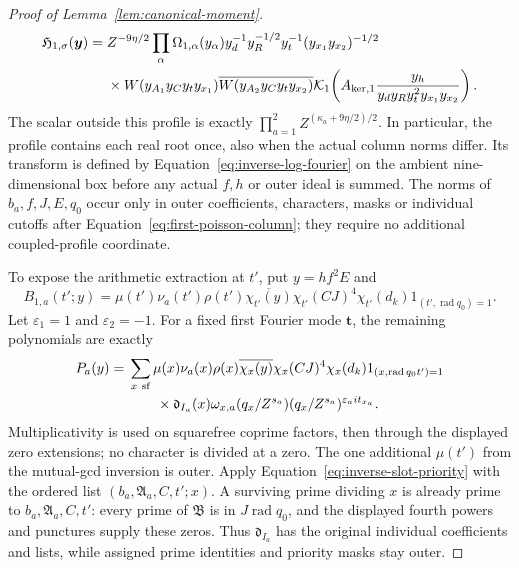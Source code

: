 \documentclass[11pt,a4paper]{article}
\numberwithin{equation}{section}
\numberwithin{figure}{section}
\theoremstyle{definition}
\theoremstyle{remark}
\begin{document}
\begin{proof}[Proof of Lemma~\ref{lem:canonical-moment}]
\begin{equation}
 \begin{split}
 \mathfrak H_{1,\sigma}(\boldsymbol y)={}&Z^{-9\eta/2}
 \prod_\alpha\Omega_{1,\alpha}(y_\alpha)
 y_d^{-1}y_R^{-1/2}y_t^{-1}(y_{x_1}y_{x_2})^{-1/2}\\
 &\times W(y_{A_1}y_Cy_ty_{x_1})
       \overline{W(y_{A_2}y_Cy_ty_{x_2})}
 \mathcal K_1\!\left(A_{{\rm ker},1}
       \frac{y_h}{y_dy_Ry_t^2y_{x_1}y_{x_2}}\right).
 \end{split}
\end{equation}
The scalar outside this profile is exactly
\(\prod_{a=1}^2Z^{(\kappa_a+9\eta/2)/2}\).
In particular, the profile contains each real root once, also when the
actual column norms differ.  Its transform is defined by
Equation~\eqref{eq:inverse-log-fourier} on the ambient nine-dimensional
box before any actual \(f,h\) or outer ideal is summed.  The norms of
\(b_a,f,J,E,q_0\) occur only in outer coefficients, characters, masks
or individual cutoffs after Equation~\eqref{eq:first-poisson-column};
they require no additional coupled-profile coordinate.

To expose the arithmetic extraction at \(t'\), put \(y=hf^2E\) and
\[
 B_{1,a}(t';y)=\mu(t')\nu_a(t')\rho(t')\overline{\chi_{t'}(y)}
       \chi_{t'}(CJ)^4\chi_{t'}(d_k)1_{(t',\operatorname{rad}q_0)=1}.
\]
Let \(\varepsilon_1=1\) and \(\varepsilon_2=-1\).  For a fixed first
Fourier mode \(\boldsymbol t\), the remaining polynomials are exactly
\begin{equation}\label{eq:inverse-first-polynomial}
 \begin{split}
 P_a(y)={}&\sum_{x\ {\rm sf}}\mu(x)\nu_a(x)\rho(x)
       \overline{\chi_x(y)}\chi_x(CJ)^4\chi_x(d_k)
       1_{(x,\operatorname{rad}q_0t')=1}\\
 &\qquad\times\mathfrak d_{I_a}(x)\omega_{x,a}(q_x/Z^{s_a})
                  (q_x/Z^{s_a})^{\varepsilon_a it_{x_a}}.
 \end{split}
\end{equation}
Multiplicativity is used on squarefree coprime factors, then through
the displayed zero extensions; no character is divided at a zero.
The one additional \(\mu(t')\) from the mutual-gcd inversion is outer.
Apply Equation~\eqref{eq:inverse-slot-priority} with the ordered list
\((b_a,\mathfrak A_a,C,t';x)\).  A surviving prime dividing \(x\)
is already prime to \(b_a,\mathfrak A_a,C,t'\): every prime of
\(\mathfrak B\) is in \(J\operatorname{rad}q_0\), and the displayed
fourth powers and punctures supply these zeros.  Thus
\(\mathfrak d_{I_a}\) has the original individual coefficients and
lists, while assigned prime identities and priority masks stay outer.


\end{proof}
\end{document}
